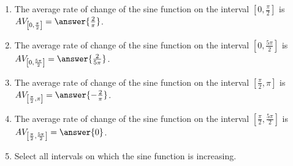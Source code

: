 \documentclass{ximera}
\author{Kenneth Berglund}
\begin{document}
\licenseAPC
\begin{exercise}
\begin{enumerate}
\item The average rate of change of the sine function on the interval $\left[0, \frac{\pi}{2}\right]$ is $AV_{\left[0, \frac{\pi}{2}\right]} = \answer{\frac{2}{\pi}}$.

\item The average rate of change of the sine function on the interval $\left[0, \frac{5\pi}{2}\right]$ is $AV_{\left[0, \frac{5\pi}{2}\right]} = \answer{\frac{2}{5\pi}}$.

\item The average rate of change of the sine function on the interval $\left[\frac{\pi}{2}, 
\pi\right]$ is $AV_{\left[\frac{\pi}{2}, \pi\right]} = \answer{-\frac{2}{\pi}}$.

\item The average rate of change of the sine function on the interval $\left[\frac{\pi}{2}, 
\frac{5\pi}{2}\right]$ is $AV_{\left[\frac{\pi}{2}, \frac{5\pi}{2}\right]} = \answer{0}$.

\item Select all intervals on which the sine function is increasing.
\begin{selectAll}
\end{selectAll}
\end{enumerate}

\end{exercise}
\end{document}
